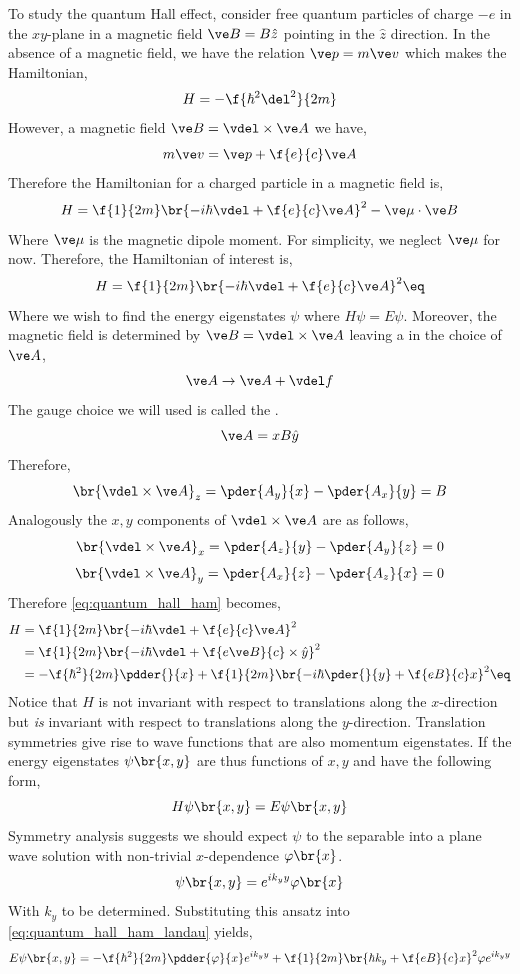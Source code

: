 \documentclass{article}
\newcommand{\vp}{\varphi}
\begin{document}
To study the quantum Hall effect, consider free quantum particles of charge $-e$ in the $xy$-plane in a magnetic field $\ve B= B \hat z$ pointing in the $\hat z$ direction. In the absence of a magnetic field, we have the relation $\ve p = m \ve v$ which makes the Hamiltonian,
\[  H = - \f{\hbar^2 \del^2}{2m} \]
However, a magnetic field $\ve B = \vdel \times \ve A$ we have,
\[ m \ve v = \ve p + \f{e}{c} \ve A \]
Therefore the Hamiltonian for a charged particle in a magnetic field is,
\[ H = \f{1}{2m} \br{- i \hbar \vdel + \f{e}{c} \ve A}^2 - \ve \mu \cdot \ve B \]
Where $\ve \mu$ is the magnetic dipole moment. For simplicity, we neglect $\ve \mu$ for now. Therefore, the Hamiltonian of interest is,
\[ H = \f{1}{2m} \br{- i \hbar \vdel + \f{e}{c} \ve A}^2 \eq \label{eq:quantum_hall_ham} \]
Where we wish to find the energy eigenstates $\psi$ where $H \psi = E \psi$. Moreover, the magnetic field is determined by $\ve B = \vdel \times \ve A$ leaving a  in the choice of $\ve A$,
\[ \ve A \to \ve A + \vdel f \]
The gauge choice we will used is called the .
\[ \ve A = x B \hat y \]
Therefore,
\[ \br{\vdel \times \ve A}_{z} = \pder{A_y}{x} - \pder{A_x}{y} = B \]
Analogously the $x,y$ components of $\vdel \times \ve A$ are as follows,
\[ \br{\vdel \times \ve A}_{x} = \pder{A_z}{y} - \pder{A_y}{z} = 0 \]
\[ \br{\vdel \times \ve A}_{y} = \pder{A_x}{z} - \pder{A_z}{x} = 0 \]
Therefore \cref{eq:quantum_hall_ham} becomes,
\begin{align*}
    H
    &= \f{1}{2m}\br{- i \hbar \vdel + \f{e}{c} \ve A}^2 \\
    &= \f{1}{2m}\br{- i \hbar \vdel + \f{e\ve B}{c} \times \hat y}^2 \\
    &= - \f{\hbar^2}{2m} \pdder{}{x} + \f{1}{2m}\br{- i \hbar \pder{}{y} + \f{eB}{c}x}^2 \eq \label{eq:quantum_hall_ham_landau}
\end{align*}
Notice that $H$ is not invariant with respect to translations along the $x$-direction but \textit{is} invariant with respect to translations along the $y$-direction. Translation symmetries give rise to wave functions that are also momentum eigenstates. If the energy eigenstates $\psi\br{x,y}$ are thus functions of $x,y$ and have the following form,
\[ H \psi\br{x,y} = E \psi\br{x,y} \]
Symmetry analysis suggests we should expect $\psi$ to the separable into a plane wave solution with non-trivial $x$-dependence $\vp\br{x}$.
\[ \psi\br{x,y} = e^{i k_y y} \vp\br{x} \]
With $k_y$ to be determined. Substituting this ansatz into \cref{eq:quantum_hall_ham_landau} yields,
\[ E \psi\br{x,y}= - \f{\hbar^2}{2m} \pdder{\vp}{x} e^{ik_yy} + \f{1}{2m}\br{\hbar k_y + \f{eB}{c}x}^2 \vp e^{ik_yy} \]
\end{document}
